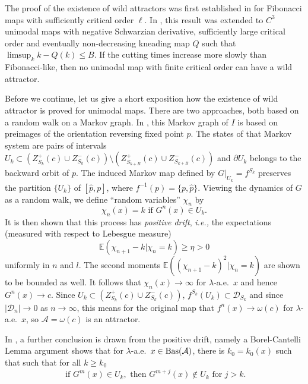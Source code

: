 \documentclass[12pt, psamsfonts, reqno]{amsart}
\begin{document}
The proof of the existence of wild attractors was first
established in \cite{BKNS} for Fibonacci maps with sufficiently
critical order $\ell$. In \cite{BTams}, this result was extended
to $C^3$ unimodal maps with negative Schwarzian derivative, sufficiently
large critical order and eventually non-decreasing kneading map $Q$ such
that $\limsup_k k-Q(k) \leq B$.
If the cutting times increase
more slowly than Fibonacci-like, then no unimodal
map with finite critical order can have a wild attractor.

Before we continue, let us give a short exposition how the
existence of wild attractor is proved for unimodal maps. There are
two approaches, both based on a random walk on a Markov graph. In
\cite{BKNS, BTams, BrHaw}, this Markov graph of $I$ is based on
preimages of the orientation reversing fixed point $p$. The states
of that Markov system are pairs of intervals $U_k \subset
(Z^+_{S_k}(c) \cup Z^-_{S_k}(c)) \setminus ( Z^+_{S_{k+B}}(c) \cup
Z^-_{S_{k+B}}(c) )$ and $\partial U_k$ belongs to the backward
orbit of $p$. The induced Markov map defined by $G|_{U_k} =
f^{S_k}$ preserves the partition $\{ U_k \}$ of $[\hat p, p]$,
where $f^{-1}(p) = \{ p, \hat p\}$. Viewing the dynamics of $G$ as
a random walk, we define ``random variables'' $\chi_n$ by
\begin{equation}\label{eq:drift}
\chi_n(x) = k \text{ if } G^n(x) \in U_k.
\end{equation}
It is then shown that this process has {\em positive
drift}, {{\em i.e., }} the expectations (measured with respect to
Lebesgue measure)
\[
{{\mathbb E}}(\chi_{n+1} - k | \chi_n = k) \geq \eta > 0
\]
uniformly in $n$ and $l$. The second moments ${{\mathbb E}}((\chi_{n+1} -
k)^2 | \chi_n = k)$ are shown to be bounded as well. It follows
that $\chi_n(x) \to \infty$ for $\lambda$-a.e.\ $x$ and hence
$G^n(x) \to c$. Since $U_k  \subset (Z^+_{S_k}(c) \cup
Z^-_{S_k}(c))$, $f^{S_k}(U_k) \subset {{\mathcal D}}_{S_k}$ and since $|{{\mathcal D}}_n|
\to 0$ as $n \to \infty$, this means for the original map
 that $f^n(x) \to \omega(c)$ for $\lambda$-a.e.\ $x$,
so  ${{\mathcal A}} = \omega(c)$ is an attractor.

In \cite[Theorem 5.2]{BrHaw}, a further conclusion is drawn from
the positive drift, namely a Borel-Cantelli Lemma argument shows that for
$\lambda$-a.e.\ $x \in {\mathop{\rm Bas}\nolimits}({{\mathcal A}})$, there is $k_0 = k_0(x)$ such that
such that for all $k \geq k_0$
\begin{equation}\label{eq:driftCB}
\text{ if } G^m(x) \in U_k,
\text{ then } G^{m+j}(x) \notin U_k
\text{ for } j > k.
\end{equation}
\end{document}
